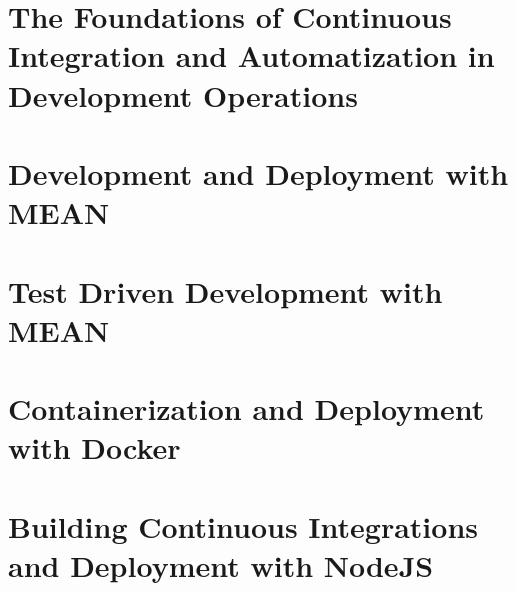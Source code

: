 
\newpage

\section{The Foundations of Continuous Integration and Automatization in Development Operations}
\label{section:The Foundations of Continuous Integration and Automatization in Development Operations}


\newpage

\section{Development and Deployment with MEAN}
\label{section:Development and Deployment with MEAN}


\newpage

\section{Test Driven Development with MEAN}
\label{section:Test Driven Development with MEAN}


\newpage

\section{Containerization and Deployment with Docker}
\label{section:Containerization and Deployment with Docker}


\newpage

\section{Building Continuous Integrations and Deployment with NodeJS}
\label{section:Building Continuous Integrations and Deployment with NodeJS}


\newpage








